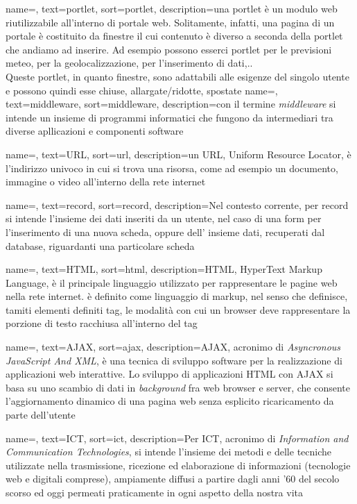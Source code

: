 {
	name=,
	text=portlet,
	sort=portlet,
	description={una portlet è un modulo web riutilizzabile all'interno di portale web. Solitamente, infatti, una pagina di un portale è costituito da finestre il cui contenuto è diverso a seconda della portlet che andiamo ad inserire. Ad esempio possono esserci portlet per le previsioni meteo, per la geolocalizzazione, per l'inserimento di dati,.. \\
	Queste portlet, in quanto finestre, sono adattabili alle esigenze del singolo utente e possono quindi esse chiuse, allargate/ridotte, spostate}
}
{
	name=,
	text=middleware,
	sort=middleware,
	description={con il termine \emph{middleware} si intende un insieme di programmi informatici che fungono da intermediari tra diverse apllicazioni e componenti software}
}

{name=,
text=URL,
sort=url,
description={un URL, Uniform Resource Locator, è l'indirizzo univoco in cui si trova una risorsa, come ad esempio un documento, immagine o video all'interno della rete internet}
}

{name=,
	text=record,
	sort=record,
	description={Nel contesto corrente, per record si intende l'insieme dei dati inseriti da un utente, nel caso di una form per l'inserimento di una nuova scheda, oppure dell' insieme dati, recuperati dal database, riguardanti una particolare scheda}
}

{name=,
	text=HTML,
	sort=html,
	description={HTML, HyperText Markup Language, è il principale linguaggio utilizzato per rappresentare le pagine web nella rete internet. è definito come linguaggio di markup, nel senso che definisce, tamiti elementi definiti tag, le modalità con cui un browser deve rappresentare la porzione di testo racchiusa all'interno del tag}
}

{name=,
	text=AJAX,
	sort=ajax,
	description={AJAX, acronimo di \emph{Asyncronous JavaScript And XML}, è una tecnica di sviluppo software per la realizzazione di applicazioni web interattive. Lo sviluppo di applicazioni HTML con AJAX si basa su uno scambio di dati in \emph{background} fra web browser e server, che consente l'aggiornamento dinamico di una pagina web senza esplicito ricaricamento da parte dell'utente}
}

{name=,
	text=ICT,
	sort=ict,
	description={Per ICT, acronimo di \emph{Information and Communication Technologies}, si intende l'insieme dei metodi e delle tecniche utilizzate nella trasmissione, ricezione ed elaborazione di informazioni (tecnologie web e digitali comprese), ampiamente diffusi a partire dagli anni '60 del secolo scorso ed oggi permeati praticamente in ogni aspetto della nostra vita}
}

